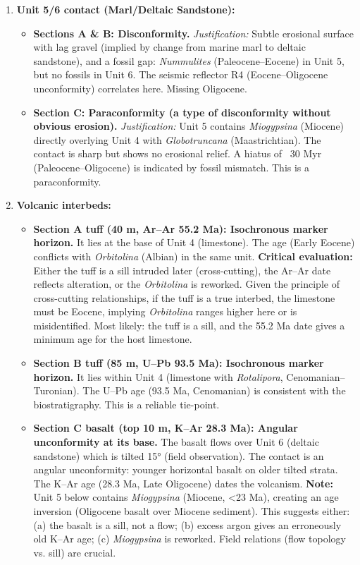 \documentclass[11pt]{article}
\newcommand{\cle}[1]{{\popxbold\color{popdark}#1}}
\begin{document}
\begin{exoresolu}
\begin{enumerate}
    \item \textbf{Unit 5/6 contact (Marl/Deltaic Sandstone):}
    \begin{itemize}
        \item \textbf{Sections A \& B: Disconformity.} 
        \emph{Justification:} Subtle erosional surface with lag gravel (implied by change from marine marl to deltaic sandstone), and a fossil gap: \emph{Nummulites} (Paleocene–Eocene) in Unit 5, but no fossils in Unit 6. The seismic reflector R4 (Eocene–Oligocene unconformity) correlates here. Missing Oligocene.
        \item \textbf{Section C: Paraconformity (a type of disconformity without obvious erosion).} 
        \emph{Justification:} Unit 5 contains \emph{Miogypsina} (Miocene) directly overlying Unit 4 with \emph{Globotruncana} (Maastrichtian). The contact is sharp but shows no erosional relief. A hiatus of ~30 Myr (Paleocene–Oligocene) is indicated by fossil mismatch. This is a \cle{paraconformity}.
    \end{itemize}
    
    \item \textbf{Volcanic interbeds:}
    \begin{itemize}
        \item \textbf{Section A tuff (40 m, Ar–Ar 55.2 Ma): Isochronous marker horizon.} It lies at the base of Unit 4 (limestone). The age (Early Eocene) conflicts with \emph{Orbitolina} (Albian) in the same unit. \textbf{Critical evaluation:} Either the tuff is a sill intruded later (cross-cutting), the Ar–Ar date reflects alteration, or the \emph{Orbitolina} is reworked. Given the principle of cross-cutting relationships, if the tuff is a true interbed, the limestone must be Eocene, implying \emph{Orbitolina} ranges higher here or is misidentified. Most likely: the tuff is a sill, and the 55.2 Ma date gives a minimum age for the host limestone.
        \item \textbf{Section B tuff (85 m, U–Pb 93.5 Ma): Isochronous marker horizon.} It lies within Unit 4 (limestone with \emph{Rotalipora}, Cenomanian–Turonian). The U–Pb age (93.5 Ma, Cenomanian) is consistent with the biostratigraphy. This is a reliable tie-point.
        \item \textbf{Section C basalt (top 10 m, K–Ar 28.3 Ma): Angular unconformity at its base.} The basalt flows over Unit 6 (deltaic sandstone) which is tilted 15° (field observation). The contact is an \cle{angular unconformity}: younger horizontal basalt on older tilted strata. The K–Ar age (28.3 Ma, Late Oligocene) dates the volcanism. \textbf{Note:} Unit 5 below contains \emph{Miogypsina} (Miocene, <23 Ma), creating an age inversion (Oligocene basalt over Miocene sediment). This suggests either: (a) the basalt is a sill, not a flow; (b) excess argon gives an erroneously old K–Ar age; (c) \emph{Miogypsina} is reworked. Field relations (flow topology vs. sill) are crucial.
    \end{itemize}
    

\end{enumerate}
\end{exoresolu}
\end{document}
